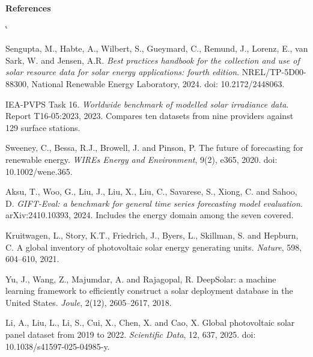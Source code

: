\documentclass[10pt,a4paper,oneside]{book}
\makeatletter
\renewenvironment{thebibliography}[1]
  {\list{\@biblabel{\@arabic\c@enumiv}}%
     {\settowidth\labelwidth{\@biblabel{#1}}%
      \leftmargin\labelwidth \advance\leftmargin\labelsep
      \usecounter{enumiv}\let\p@enumiv\@empty
      \renewcommand\theenumiv{\@arabic\c@enumiv}}%
   \sloppy\clubpenalty4000 \@clubpenalty\clubpenalty
   \widowpenalty4000 \sfcode`\.\@m}
  {\endlist}
\makeatother
\begin{document}
\begin{landscape}
\vspace{1.4em}
{\sffamily\bfseries\large References\par}
\vspace{0.3em}
{\sffamily\fontsize{6.8}{8.6}\selectfont\color{tinta2}
\begin{thebibliography}{99}
\setlength{\itemsep}{0.15em}

 Sengupta, M., Habte, A., Wilbert, S., Gueymard, C.,
  Remund, J., Lorenz, E., van Sark, W. and Jensen, A.R. \emph{Best practices
  handbook for the collection and use of solar resource data for solar energy
  applications: fourth edition}. NREL/TP-5D00-88300, National Renewable Energy
  Laboratory, 2024. doi: 10.2172/2448063.

 IEA-PVPS Task 16. \emph{Worldwide benchmark of modelled
  solar irradiance data}. Report T16-05:2023, 2023. Compares ten datasets from
  nine providers against 129 surface stations.

 Sweeney, C., Bessa, R.J., Browell, J. and Pinson, P. The
  future of forecasting for renewable energy. \emph{WIREs Energy and
  Environment}, 9(2), e365, 2020. doi: 10.1002/wene.365.

 Aksu, T., Woo, G., Liu, J., Liu, X., Liu, C., Savarese, S.,
  Xiong, C. and Sahoo, D. \emph{GIFT-Eval: a benchmark for general time series
  forecasting model evaluation}. arXiv:2410.10393, 2024. Includes the energy
  domain among the seven covered.

 Kruitwagen, L., Story, K.T., Friedrich, J., Byers, L.,
  Skillman, S. and Hepburn, C. A global inventory of photovoltaic solar energy
  generating units. \emph{Nature}, 598, 604--610, 2021.

 Yu, J., Wang, Z., Majumdar, A. and Rajagopal, R. DeepSolar: a
  machine learning framework to efficiently construct a solar deployment
  database in the United States. \emph{Joule}, 2(12), 2605--2617, 2018.

 Li, A., Liu, L., Li, S., Cui, X., Chen, X. and Cao, X.
  Global photovoltaic solar panel dataset from 2019 to 2022.
  \emph{Scientific Data}, 12, 637, 2025.
  doi: 10.1038/s41597-025-04985-y.


\end{thebibliography}}
\end{landscape}
\end{document}
